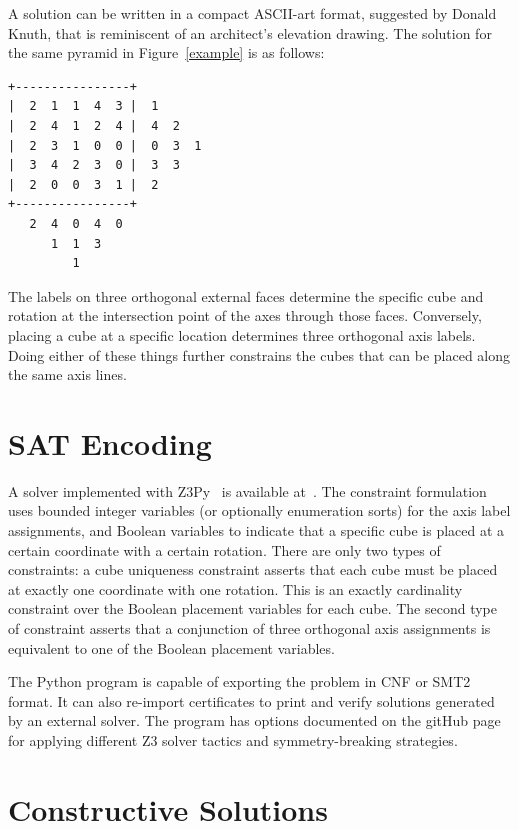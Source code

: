 \documentclass[conference]{IEEEtran}
\begin{document}
A solution can be written in a compact ASCII-art format, suggested by Donald Knuth, that is reminiscent of an architect's elevation drawing.
The solution for the same pyramid in Figure~\ref{example} is as follows:

\begin{center}
\begin{small}
\begin{BVerbatim}
+----------------+
|  2  1  1  4  3 |  1
|  2  4  1  2  4 |  4  2
|  2  3  1  0  0 |  0  3  1
|  3  4  2  3  0 |  3  3
|  2  0  0  3  1 |  2
+----------------+
   2  4  0  4  0
      1  1  3
         1
\end{BVerbatim}
\end{small}
\end{center}

The labels on three orthogonal external faces determine the specific cube and rotation at the intersection point of the axes through those faces.
Conversely, placing a cube at a specific location determines three orthogonal axis labels.
Doing either of these things further constrains the cubes that can be placed along the same axis lines.

\section{SAT Encoding}

A solver implemented with Z3Py~\cite{z3} is available at~\cite{b1}.
The constraint formulation uses bounded integer variables (or optionally enumeration sorts) for the axis label assignments,
and Boolean variables to indicate that a specific cube is placed at a certain coordinate with a certain rotation.
There are only two types of constraints: a cube uniqueness constraint asserts that each cube must be placed at exactly one coordinate with one rotation.
This is an exactly cardinality constraint over the Boolean placement variables for each cube.
The second type of constraint asserts that a conjunction of three orthogonal axis assignments is equivalent to one of the Boolean placement variables.

The Python program is capable of exporting the problem in CNF or SMT2 format.
It can also re-import certificates to print and verify solutions generated by an external solver.
The program has options documented on the gitHub page for applying different Z3 solver tactics and symmetry-breaking strategies.

\section{Constructive Solutions}
\end{document}
